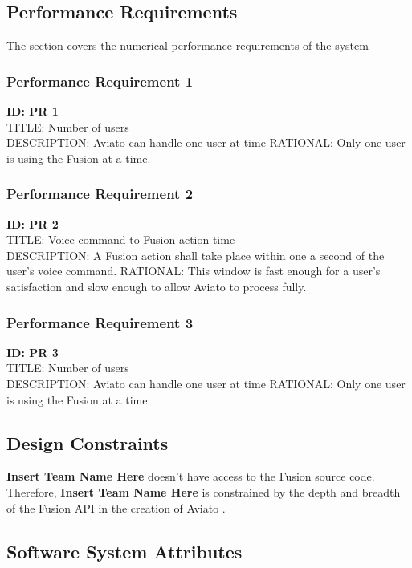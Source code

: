 \documentclass[onecolumn, draftclsnofoot,10pt, compsoc]{IEEEtran}
\def \CapstoneTeamName{\textbf{Insert Team Name Here} }
\def \botname{Aviato }
\begin{document}
        
    \subsection{Performance Requirements}
    	The section covers the numerical performance requirements of the system
        
        \subsubsection{Performance Requirement 1}
    	\textbf{ID: PR 1} \\
        TITLE: Number  of users \\
        DESCRIPTION: \botname can handle one user at time
        RATIONAL: Only one user is using the Fusion at a time. \\
        
        \subsubsection{Performance Requirement 2}
    	\textbf{ID: PR 2} \\
        TITLE: Voice command to Fusion action time \\
        DESCRIPTION: A Fusion action shall take place within one a second of the user's voice command.
        RATIONAL: This window is fast enough for a user's satisfaction and slow enough to allow \botname to process fully.\\
        
        \subsubsection{Performance Requirement 3}
    	\textbf{ID: PR 3} \\
        TITLE: Number  of users \\
        DESCRIPTION: \botname can handle one user at time
        RATIONAL: Only one user is using the Fusion at a time. \\
        
    \subsection{Design Constraints}
    	\CapstoneTeamName doesn't have access to the Fusion source code. Therefore, \CapstoneTeamName is constrained by the depth and breadth of the Fusion API in the creation of \botname.
        
    \subsection{Software System Attributes}
    
\end{document}
